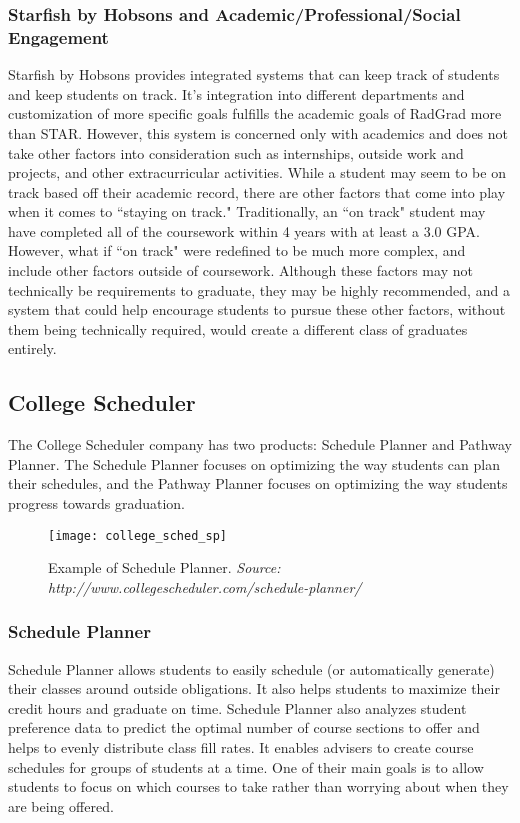 \subsubsection{Starfish by Hobsons and Academic/Professional/Social Engagement}
Starfish by Hobsons provides integrated systems that can keep track of students and keep students on track. It's integration into different departments and customization of more specific goals fulfills the academic goals of RadGrad more than STAR. However, this system is concerned only with academics and does not take other factors into consideration such as internships, outside work and projects, and other extracurricular activities. While a student may seem to be on track based off their academic record, there are other factors that come into play when it comes to ``staying on track." Traditionally, an ``on track" student may have completed all of the coursework within 4 years with at least a 3.0 GPA. However, what if ``on track" were redefined to be much more complex, and include other factors outside of coursework. Although these factors may not technically be requirements to graduate, they may be highly recommended, and a system that could help encourage students to pursue these other factors, without them being technically required, would create a different class of graduates entirely. 

\subsection{College Scheduler}
The College Scheduler company has two products: Schedule Planner and Pathway Planner. The Schedule Planner focuses on optimizing the way students can plan their schedules, and the Pathway Planner focuses on optimizing the way students progress towards graduation.

\begin{figure}[h]
\centering
\texttt{[image: college\_sched\_sp]}
\caption{Example of Schedule Planner. \textit{Source: http://www.collegescheduler.com/schedule-planner/}}
\end{figure}


\subsubsection{Schedule Planner}
Schedule Planner allows students to easily schedule (or automatically generate) their classes around outside obligations. It also helps students to maximize their credit hours and graduate on time. Schedule Planner also analyzes student preference data to predict the optimal number of course sections to offer and helps to evenly distribute class fill rates. It enables advisers to create course schedules for groups of students at a time. One of their main goals is to allow students to focus on which courses to take rather than worrying about when they are being offered.


